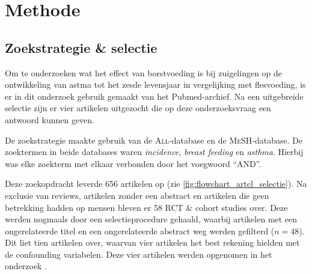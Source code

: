 \documentclass[abstract=true]{scrartcl}
\begin{document}
\section{Methode}
    \subsection{Zoekstrategie \& selectie}
    Om te onderzoeken wat het effect van borstvoeding is bij zuigelingen op de ontwikkeling van astma tot het zesde levensjaar in vergelijking met flesvoeding, is er in dit onderzoek gebruik gemaakt van het Pubmed-archief. Na een uitgebreide selectie zijn er vier artikelen uitgezocht die op deze onderzoeksvraag een antwoord kunnen geven.\hfil

    De zoekstrategie maakte gebruik van de \textsc{All}-database en de \textsc{MeSH}-database. De zoektermen in beide databases waren \emph{incidence}, \emph{breast feeding} en \emph{asthma}. Hierbij was elke zoekterm met elkaar verbonden door het voegwoord ``\uppercase{and}''.

Deze zoekopdracht leverde 656 artikelen op (zie \cref{fig:flowchart_artcl_selectie}). Na exclusie van reviews, artikelen zonder een abstract en artikelen die geen betrekking hadden op mensen bleven er 58 RCT \& cohort studies over. Deze werden nogmaals door een selectieprocedure gehaald, waarbij artikelen met een ongerelateerde titel en een ongerelateerde abstract weg werden gefilterd ($n = 48$).
Dit liet tien artikelen over, waarvan vier artikelen het best rekening hielden met de confounding variabelen. Deze vier artikelen werden opgenomen in het onderzoek \cite{chandra1997five,den_Dekker_2016,oddy1999association,dell2001breastfeeding}.


\end{document}
